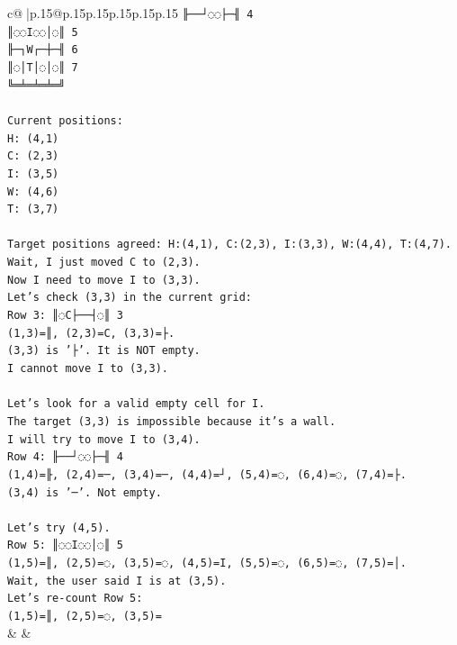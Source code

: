 \documentclass{article}
\begin{document}
{\begin{supertabular}{c@{$\;$}|p{.15\linewidth}@{}p{.15\linewidth}p{.15\linewidth}p{.15\linewidth}p{.15\linewidth}p{.15\linewidth}}
{{{\texttt{╟──┘◌◌├─╢ 4} \\
\texttt{║◌◌I◌◌│◌║ 5} \\
\texttt{╟─┐W┌─┼─╢ 6} \\
\texttt{║◌│T│◌│◌║ 7} \\
\texttt{╚═╧═╧═╧═╝} \\
\\ 
\texttt{Current positions:} \\
\texttt{H: (4,1)} \\
\texttt{C: (2,3)} \\
\texttt{I: (3,5)} \\
\texttt{W: (4,6)} \\
\texttt{T: (3,7)} \\
\\ 
\texttt{Target positions agreed: H:(4,1), C:(2,3), I:(3,3), W:(4,4), T:(4,7).} \\
\texttt{Wait, I just moved C to (2,3).} \\
\texttt{Now I need to move I to (3,3).} \\
\texttt{Let's check (3,3) in the current grid:} \\
\texttt{Row 3: ║◌C├──┤◌║ 3} \\
\texttt{(1,3)=║, (2,3)=C, (3,3)=├.} \\
\texttt{(3,3) is '├'. It is NOT empty.} \\
\texttt{I cannot move I to (3,3).} \\
\\ 
\texttt{Let's look for a valid empty cell for I.} \\
\texttt{The target (3,3) is impossible because it's a wall.} \\
\texttt{I will try to move I to (3,4).} \\
\texttt{Row 4: ╟──┘◌◌├─╢ 4} \\
\texttt{(1,4)=╟, (2,4)=─, (3,4)=─, (4,4)=┘, (5,4)=◌, (6,4)=◌, (7,4)=├.} \\
\texttt{(3,4) is '─'. Not empty.} \\
\\ 
\texttt{Let's try (4,5).} \\
\texttt{Row 5: ║◌◌I◌◌│◌║ 5} \\
\texttt{(1,5)=║, (2,5)=◌, (3,5)=◌, (4,5)=I, (5,5)=◌, (6,5)=◌, (7,5)=│.} \\
\texttt{Wait, the user said I is at (3,5).} \\
\texttt{Let's re{-}count Row 5:} \\
\texttt{(1,5)=║, (2,5)=◌, (3,5)=} \\
            }
        }
    }
    & & \\ \\


\end{supertabular}}
\end{document}
